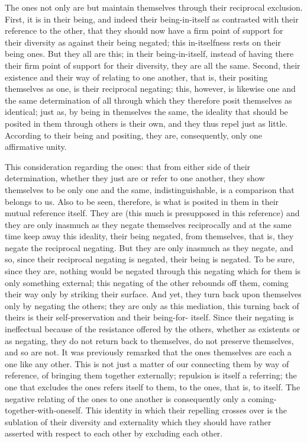 The ones not only are but maintain themselves
through their reciprocal exclusion.
First, it is in their being,
and indeed their being-in-itself as
contrasted with their reference to the other,
that they should now have a firm point of support
for their diversity as against their being negated;
this in-itselfness rests on their being ones.
But they all are this;
in their being-in-itself,
instead of having there their
firm point of support for their diversity,
they are all the same.
Second, their existence and their
way of relating to one another,
that is, their positing themselves as one,
is their reciprocal negating;
this, however, is likewise one and the same determination of
all through which they therefore posit themselves as identical;
just as, by being in themselves the same,
the ideality that should be posited in them
through others is their own,
and they thus repel just as little.
According to their being and positing,
they are, consequently, only one affirmative unity.

This consideration regarding the ones:
that from either side of their determination,
whether they just are or refer to one another,
they show themselves to be only one and the same, indistinguishable,
is a comparison that belongs to us.
Also to be seen, therefore, is what is posited in them
in their mutual reference itself.
They are (this much is presupposed in this reference)
and they are only inasmuch as
they negate themselves reciprocally
and at the same time keep away this ideality,
their being negated, from themselves, that is,
they negate the reciprocal negating.
But they are only inasmuch as they negate,
and so, since their reciprocal negating is negated,
their being is negated.
To be sure, since they are,
nothing would be negated through this negating
which for them is only something external;
this negating of the other rebounds off them,
coming their way only by striking their surface.
And yet, they turn back upon themselves
only by negating the others;
they are only as this mediation,
this turning back of theirs is their self-preservation
and their being-for- itself.
Since their negating is ineffectual
because of the resistance offered by the others,
whether as existents or as negating,
they do not return back to themselves,
do not preserve themselves, and so are not.
It was previously remarked that
the ones themselves are each a one like any other.
This is not just a matter of our
connecting them by way of reference,
of bringing them together externally;
repulsion is itself a referring;
the one that excludes the ones refers itself to them,
to the ones, that is, to itself.
The negative relating of the ones to one another is consequently
only a coming-together-with-oneself.
This identity in which their repelling crosses over is
the sublation of their diversity and externality
which they should have rather asserted with respect to
each other by excluding each other.

